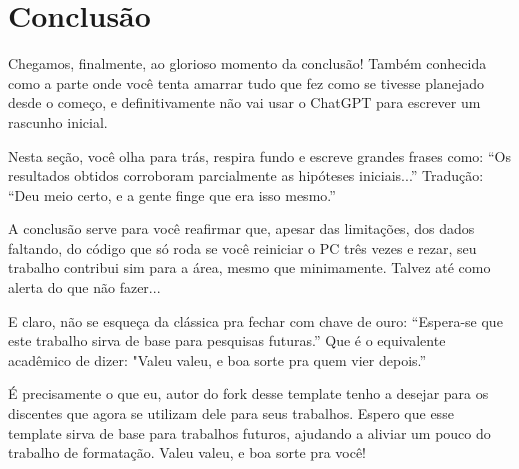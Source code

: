 \chapter{Conclusão}
\label{chap:conclusao}

Chegamos, finalmente, ao glorioso momento da conclusão! Também conhecida como a parte onde você tenta amarrar tudo que fez como se tivesse planejado desde o começo, e definitivamente não vai usar o ChatGPT para escrever um rascunho inicial.

Nesta seção, você olha para trás, respira fundo e escreve grandes frases como: “Os resultados obtidos corroboram parcialmente as hipóteses iniciais...” Tradução: “Deu meio certo, e a gente finge que era isso mesmo.”

A conclusão serve para você reafirmar que, apesar das limitações, dos dados faltando, do código que só roda se você reiniciar o PC três vezes e rezar, seu trabalho contribui sim para a área, mesmo que minimamente. Talvez até como alerta do que não fazer...

E claro, não se esqueça da clássica pra fechar com chave de ouro: “Espera-se que este trabalho sirva de base para pesquisas futuras.” Que é o equivalente acadêmico de dizer: "Valeu valeu, e boa sorte pra quem vier depois.”

É precisamente o que eu, autor do fork desse template tenho a desejar para os discentes que agora se utilizam dele para seus trabalhos. Espero que esse template sirva de base para trabalhos futuros, ajudando a aliviar um pouco do trabalho de formatação. Valeu valeu, e boa sorte pra você!
